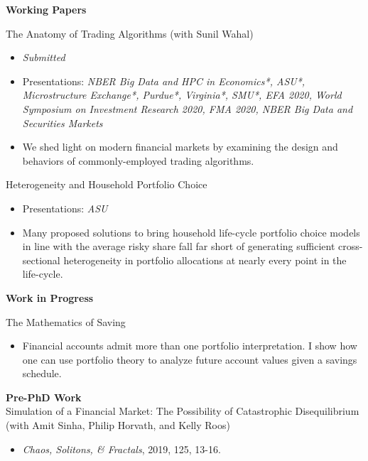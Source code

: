 \documentclass[11pt]{article}
\newenvironment{innerlist}[1][\enskip\textbullet]%
        {\begin{itemize}[#1,leftmargin=*,parsep=0pt,itemsep=0pt,topsep=0pt,partopsep=0pt]}
        {\end{itemize}}
\newcommand{\halfblankline}{\quad\vspace{-0.5\baselineskip}\pagebreak[3]}
\begin{document}
\halfblankline

\textbf{Working Papers}

\halfblankline
 
The Anatomy of Trading Algorithms (with Sunil Wahal) 
\begin{innerlist}
        \item[] \textit{Submitted}
        \item[] \begin{footnotesize}
                Presentations: \textit{NBER Big Data and HPC in Economics*, ASU*, Microstructure Exchange*, Purdue*, Virginia*, SMU*, EFA 2020, World Symposium on Investment Research 2020, FMA 2020, NBER Big Data and Securities Markets}
        \end{footnotesize}
        \item[] We shed light on modern financial markets by examining the design and behaviors of commonly-employed trading algorithms.
\end{innerlist}


\halfblankline

Heterogeneity and Household Portfolio Choice
\begin{innerlist}
        \item[] \begin{footnotesize}
                Presentations: \textit{ASU}
        \end{footnotesize}
        \item[] Many proposed solutions to bring household life-cycle portfolio choice models in line with the average risky share fall far short of generating sufficient cross-sectional heterogeneity in portfolio allocations at nearly every point in the life-cycle. 
\end{innerlist}


\halfblankline

\textbf{Work in Progress}

\halfblankline

The Mathematics of Saving
\begin{innerlist}
        \item[] Financial accounts admit more than one portfolio interpretation. I show how one can use portfolio theory to analyze future account values given a savings schedule.
\end{innerlist}


\halfblankline

\textbf{Pre-PhD Work} \\
Simulation of a Financial Market: The Possibility of Catastrophic Disequilibrium (with Amit Sinha, Philip Horvath, and Kelly Roos)
\begin{innerlist}
        \item[] \textit{Chaos, Solitons, \& Fractals}, 2019, 125, 13-16.
\end{innerlist}
\end{document}
